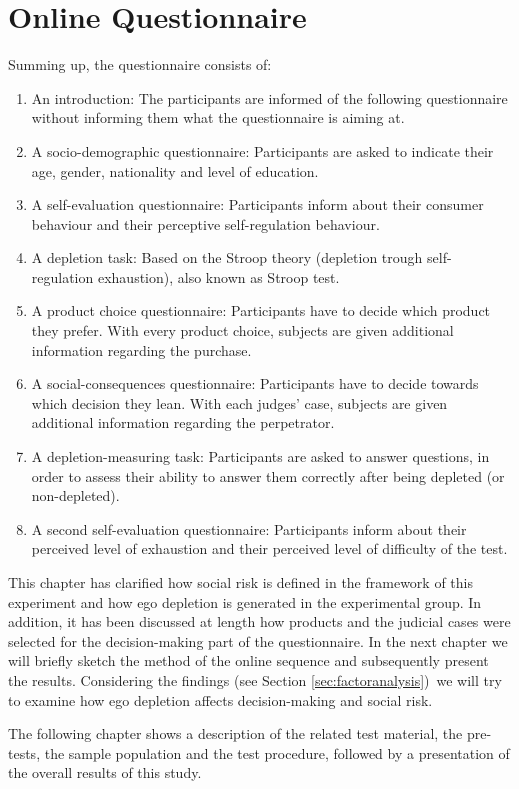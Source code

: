 \section{Online Questionnaire}
Summing up, the questionnaire consists of:
\begin{enumerate}
\item An introduction: The participants are informed of the following questionnaire without informing them what the questionnaire is aiming at. 
\item A socio-demographic questionnaire: Participants are asked to indicate their age, gender, nationality and level of education.
\item A self-evaluation questionnaire: Participants inform about their consumer behaviour and their perceptive self-regulation behaviour.
\item A depletion task: Based on the Stroop theory (depletion trough self-regulation exhaustion), also known as Stroop test.  
\item A product choice questionnaire: Participants have to decide which product they prefer. With every product choice, subjects are given additional information regarding the purchase.
\item A social-consequences questionnaire: Participants have to decide towards which decision they lean. With each judges’ case, subjects are given additional information regarding the perpetrator.
\item A depletion-measuring task: Participants are asked to answer questions, in order to assess their ability to answer them correctly after being depleted (or non-depleted).
\item A second self-evaluation questionnaire: Participants inform about their perceived level of exhaustion and their perceived level of difficulty of the test.
\end{enumerate}

This chapter has clarified how social risk is defined in the framework of this experiment and how ego depletion is generated in the experimental group.  In addition, it has been discussed at length how products and the judicial cases were selected for the decision-making part of the questionnaire. In the next chapter we will briefly sketch the method of the online sequence and subsequently present the results. Considering the findings (see Section \ref{sec:factoranalysis})\, we will try to examine how ego depletion affects decision-making and social risk. \par
The following chapter shows a description of the related test material, the pre-tests, the sample population and the test procedure, followed by a presentation of the overall results of this study.\par

